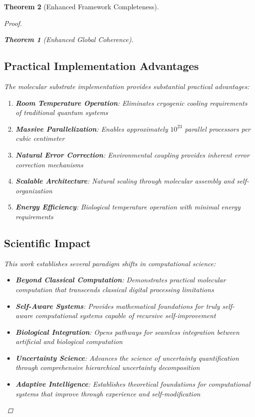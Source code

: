 \documentclass[12pt,a4paper]{article}
\newtheorem{theorem}{Theorem}[section]
\begin{document}
\begin{theorem}[Enhanced Framework Completeness]
\begin{enumerate}
\begin{proof}
\begin{enumerate}
\begin{enumerate}
\begin{theorem}[Enhanced Global Coherence]
\begin{enumerate}
\subsection{Practical Implementation Advantages}

The molecular substrate implementation provides substantial practical advantages:

\begin{enumerate}
\item \textbf{Room Temperature Operation}: Eliminates cryogenic cooling requirements of traditional quantum systems
\item \textbf{Massive Parallelization}: Enables approximately $10^{23}$ parallel processors per cubic centimeter
\item \textbf{Natural Error Correction}: Environmental coupling provides inherent error correction mechanisms
\item \textbf{Scalable Architecture}: Natural scaling through molecular assembly and self-organization
\item \textbf{Energy Efficiency}: Biological temperature operation with minimal energy requirements
\end{enumerate}

\subsection{Scientific Impact}

This work establishes several paradigm shifts in computational science:

\begin{itemize}
\item \textbf{Beyond Classical Computation}: Demonstrates practical molecular computation that transcends classical digital processing limitations
\item \textbf{Self-Aware Systems}: Provides mathematical foundations for truly self-aware computational systems capable of recursive self-improvement
\item \textbf{Biological Integration}: Opens pathways for seamless integration between artificial and biological computation
\item \textbf{Uncertainty Science}: Advances the science of uncertainty quantification through comprehensive hierarchical uncertainty decomposition
\item \textbf{Adaptive Intelligence}: Establishes theoretical foundations for computational systems that improve through experience and self-modification
\end{itemize}


\end{enumerate}
\end{theorem}
\end{enumerate}
\end{enumerate}
\end{proof}
\end{enumerate}
\end{theorem}
\end{document}
